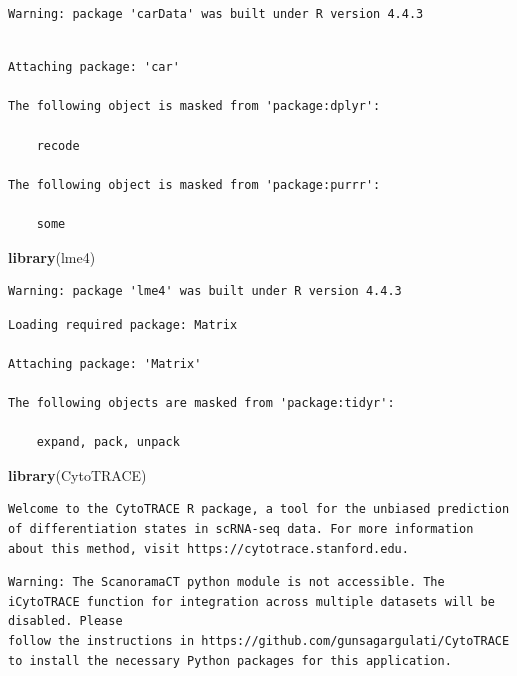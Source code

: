 \documentclass[
  landscape]{article}
\newenvironment{Shaded}{\begin{snugshade}}{\end{snugshade}}
\newcommand{\FunctionTok}[1]{\textcolor[rgb]{0.13,0.29,0.53}{\textbf{#1}}}
\newcommand{\NormalTok}[1]{#1}
\begin{document}
\begin{verbatim}
Warning: package 'carData' was built under R version 4.4.3
\end{verbatim}

\begin{verbatim}

Attaching package: 'car'

The following object is masked from 'package:dplyr':

    recode

The following object is masked from 'package:purrr':

    some
\end{verbatim}

\begin{Shaded}
\begin{Highlighting}[]
\FunctionTok{library}\NormalTok{(lme4)}
\end{Highlighting}
\end{Shaded}

\begin{verbatim}
Warning: package 'lme4' was built under R version 4.4.3
\end{verbatim}

\begin{verbatim}
Loading required package: Matrix

Attaching package: 'Matrix'

The following objects are masked from 'package:tidyr':

    expand, pack, unpack
\end{verbatim}

\begin{Shaded}
\begin{Highlighting}[]
\FunctionTok{library}\NormalTok{(CytoTRACE)}
\end{Highlighting}
\end{Shaded}

\begin{verbatim}
Welcome to the CytoTRACE R package, a tool for the unbiased prediction of differentiation states in scRNA-seq data. For more information about this method, visit https://cytotrace.stanford.edu.
\end{verbatim}

\begin{verbatim}
Warning: The ScanoramaCT python module is not accessible. The iCytoTRACE function for integration across multiple datasets will be disabled. Please
follow the instructions in https://github.com/gunsagargulati/CytoTRACE to install the necessary Python packages for this application.
\end{verbatim}
\end{document}
